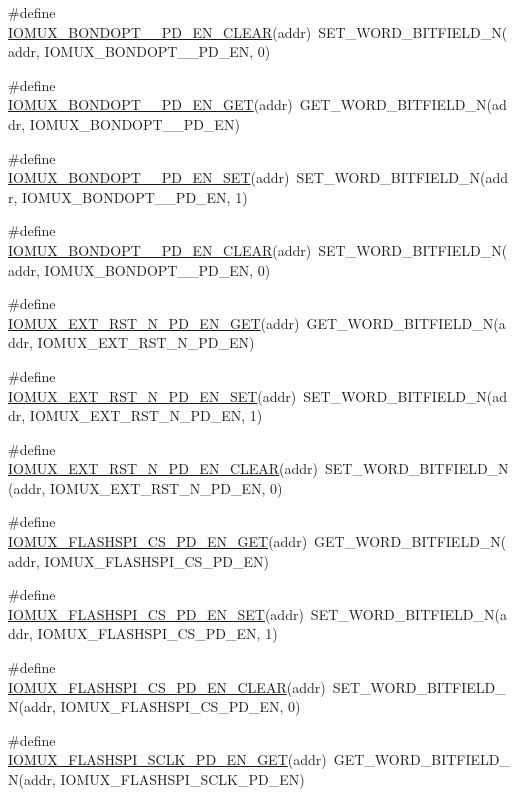 \begin{DoxyCompactItemize}
\item 
\#define \hyperlink{a00559_ab3d41964f6af250746a3dfb32ec5a2b5}{IOMUX\_\-BONDOPT\_\_\-PD\_\-EN\_\-CLEAR}(addr)~SET\_\-WORD\_\-BITFIELD\_\-N(addr, IOMUX\_\-BONDOPT\_\_\-PD\_\-EN, 0)
\item 
\#define \hyperlink{a00559_aaf8e814666812dd4412716429836b6fc}{IOMUX\_\-BONDOPT\_\_\-PD\_\-EN\_\-GET}(addr)~GET\_\-WORD\_\-BITFIELD\_\-N(addr, IOMUX\_\-BONDOPT\_\_\-PD\_\-EN)
\item 
\#define \hyperlink{a00559_a7293e99dd3834290e027bea463e86002}{IOMUX\_\-BONDOPT\_\_\-PD\_\-EN\_\-SET}(addr)~SET\_\-WORD\_\-BITFIELD\_\-N(addr, IOMUX\_\-BONDOPT\_\_\-PD\_\-EN, 1)
\item 
\#define \hyperlink{a00559_a3f1dceb50732faee0d8fe8ad4597fbcf}{IOMUX\_\-BONDOPT\_\_\-PD\_\-EN\_\-CLEAR}(addr)~SET\_\-WORD\_\-BITFIELD\_\-N(addr, IOMUX\_\-BONDOPT\_\_\-PD\_\-EN, 0)
\item 
\#define \hyperlink{a00559_a8fb8dbcc1be30e5b3e0f8b3e4ce85223}{IOMUX\_\-EXT\_\-RST\_\-N\_\-PD\_\-EN\_\-GET}(addr)~GET\_\-WORD\_\-BITFIELD\_\-N(addr, IOMUX\_\-EXT\_\-RST\_\-N\_\-PD\_\-EN)
\item 
\#define \hyperlink{a00559_aa8f6771efebf8b1d16627133f135c1a7}{IOMUX\_\-EXT\_\-RST\_\-N\_\-PD\_\-EN\_\-SET}(addr)~SET\_\-WORD\_\-BITFIELD\_\-N(addr, IOMUX\_\-EXT\_\-RST\_\-N\_\-PD\_\-EN, 1)
\item 
\#define \hyperlink{a00559_a84099ee45bd177aa1053bb1866765bae}{IOMUX\_\-EXT\_\-RST\_\-N\_\-PD\_\-EN\_\-CLEAR}(addr)~SET\_\-WORD\_\-BITFIELD\_\-N(addr, IOMUX\_\-EXT\_\-RST\_\-N\_\-PD\_\-EN, 0)
\item 
\#define \hyperlink{a00559_a7afb3f617bb015581009c45e620fb21f}{IOMUX\_\-FLASHSPI\_\-CS\_\-PD\_\-EN\_\-GET}(addr)~GET\_\-WORD\_\-BITFIELD\_\-N(addr, IOMUX\_\-FLASHSPI\_\-CS\_\-PD\_\-EN)
\item 
\#define \hyperlink{a00559_ae0b4f3fd7d0e51ce1472a94493f5b13e}{IOMUX\_\-FLASHSPI\_\-CS\_\-PD\_\-EN\_\-SET}(addr)~SET\_\-WORD\_\-BITFIELD\_\-N(addr, IOMUX\_\-FLASHSPI\_\-CS\_\-PD\_\-EN, 1)
\item 
\#define \hyperlink{a00559_ad0fcb91104f8ded4fe62eedde5af0f6d}{IOMUX\_\-FLASHSPI\_\-CS\_\-PD\_\-EN\_\-CLEAR}(addr)~SET\_\-WORD\_\-BITFIELD\_\-N(addr, IOMUX\_\-FLASHSPI\_\-CS\_\-PD\_\-EN, 0)
\item 
\#define \hyperlink{a00559_a9ba408d03913cbfe12f4ec868e57820c}{IOMUX\_\-FLASHSPI\_\-SCLK\_\-PD\_\-EN\_\-GET}(addr)~GET\_\-WORD\_\-BITFIELD\_\-N(addr, IOMUX\_\-FLASHSPI\_\-SCLK\_\-PD\_\-EN)
\item 

\end{DoxyCompactItemize}
